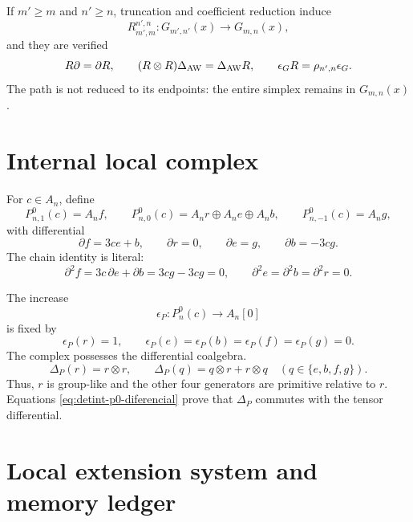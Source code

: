 If \(m'\ge m\) and \(n'\ge n\), truncation and coefficient reduction
induce
\begin{equation}\label{eq:detint-rmn}
 R_{m',m}^{n',n}:G_{m',n'}(x)\longrightarrow G_{m,n}(x),
\end{equation}
and they are verified
\begin{equation}\label{eq:detint-aw-natural}
 R\partial=\partial R,
 \qquad
 (R\otimes R)\Delta_{\rm AW}=\Delta_{\rm AW}R,
 \qquad
 \epsilon_GR=\rho_{n',n}\epsilon_G.
\end{equation}
The path is not reduced to its endpoints: the entire simplex remains in
\(G_{m,n}(x)\).

\iffalse
\section{Internal local complex}

For \(c\in A_n\), define
\begin{equation}\label{eq:detint-p0-grados}
 P^0_{n,1}(c)=A_nf,
 \qquad
 P^0_{n,0}(c)=A_nr\oplus A_ne\oplus A_nb,
 \qquad
 P^0_{n,-1}(c)=A_ng,
\end{equation}
with differential
\begin{equation}\label{eq:detint-p0-diferencial}
 \partial f=3ce+b,
 \qquad
 \partial r=0,
 \qquad
 \partial e=g,
 \qquad
 \partial b=-3cg.
\end{equation}
The chain identity is literal:
\begin{equation}\label{eq:detint-d2}
 \partial^2f=3c\,\partial e+\partial b=3cg-3cg=0,
 \qquad
 \partial^2e=\partial^2b=\partial^2r=0.
\end{equation}

The increase
\begin{equation}\label{eq:detint-epsilon-p}
 \epsilon_P:P_n^0(c)\longrightarrow A_n[0]
\end{equation}
is fixed by
\[
 \epsilon_P(r)=1,
 \qquad
 \epsilon_P(e)=\epsilon_P(b)=\epsilon_P(f)=\epsilon_P(g)=0.
\]
The complex possesses the differential coalgebra.
\begin{equation}\label{eq:detint-coalgebra-p}
 \Delta_P(r)=r\otimes r,
 \qquad
 \Delta_P(q)=q\otimes r+r\otimes q
 \quad(q\in\{e,b,f,g\}).
\end{equation}
Thus, \(r\) is group-like and the other four generators are primitive
relative to \(r\). Equations
\eqref{eq:detint-p0-diferencial} prove that \(\Delta_P\) commutes with the
tensor differential.

\section{Local extension system and memory ledger}

